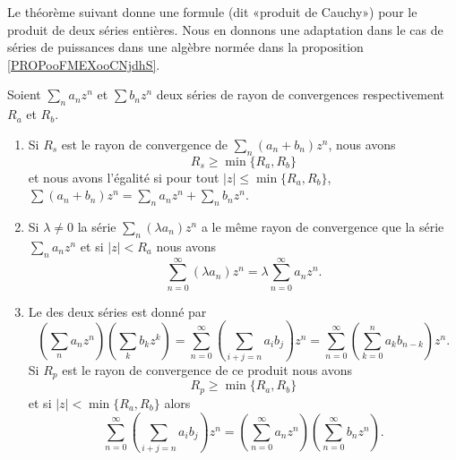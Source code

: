 Le théorème suivant donne une formule (dit «produit de Cauchy») pour le produit de deux séries entières. Nous en donnons une adaptation dans le cas de séries de puissances dans une algèbre normée dans la proposition \ref{PROPooFMEXooCNjdhS}.
\begin{theorem}     \label{ThokPTXYC}
    Soient \( \sum_na_nz^n\) et \( \sum b_nz^n\) deux séries de rayon de convergences respectivement \( R_a\) et \( R_b\).
    \begin{enumerate}
        \item   \label{IteWlajij}
            Si \( R_s\) est le rayon de convergence de \( \sum_n(a_n+b_n)z^n\), nous avons
            \begin{equation}
                R_s\geq \min\{ R_a,R_b \}
            \end{equation}
            et nous avons l'égalité si pour tout \( |z |\leq\min\{ R_a,R_b \}\), \( \sum (a_n+b_n)z^n=\sum_n a_nz^n+\sum_nb_nz^n\).
        \item
            Si \( \lambda\neq 0\) la série \( \sum_n(\lambda a_n)z^n\) a le même rayon de convergence que la série \( \sum_na_nz^n\) et si \( | z |<R_a\) nous avons
            \begin{equation}
                \sum_{n=0}^{\infty}(\lambda a_n)z^n=\lambda\sum_{n=0}^{\infty}a_nz^n.
            \end{equation}
        \item
            Le  des deux séries est donné par
            \begin{equation}        \label{EqFPGGooDQlXGe}
                \left( \sum_na_nz^n \right)\left( \sum_k b_kz^k \right)=       \sum_{n=0}^{\infty}\left( \sum_{i+j=n}a_ib_j \right)z^n=\sum_{n=0}^{\infty}\left( \sum_{k=0}^{n}a_kb_{n-k} \right)z^n.
            \end{equation}
            Si \( R_p\) est le rayon de convergence de ce produit nous avons
            \begin{equation}
                R_p\geq \min\{ R_a,R_b \}
            \end{equation}
            et si \( | z |<\min\{ R_a,R_b \}\) alors
            \begin{equation}
                \sum_{n=0}^{\infty}\left( \sum_{i+j=n}a_ib_j \right)z^n=\left( \sum_{n=0}^{\infty}a_nz^n \right)\left( \sum_{n=0}^{\infty}b_nz^n \right).
            \end{equation}

    \end{enumerate}

\end{theorem}


